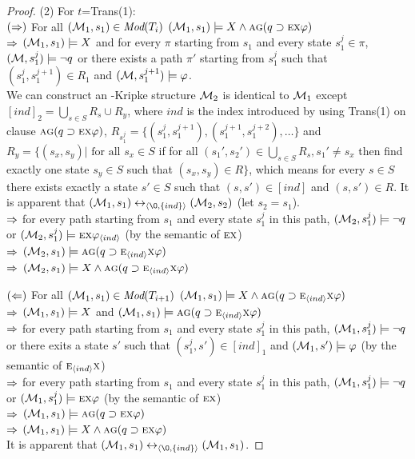 \documentclass[letterpaper]{article} %
\begin{document}
\begin{proof}
(2) For $t$=Trans(1):\\
$(\Rightarrow)$ For all $({\cal M}_1,s_1) \in \textit{Mod}(T_i)$ \ie $({\cal M}_1, s_1) \models X \wedge \textsc{a}\textsc{g}(q \supset \textsc{e} \textsc{x} \varphi)$\\
$\Rightarrow$ $({\cal M}_1,s_1)\models X$ and for every $\pi$ starting from $s_1$ and every state $s_1^j \in \pi$, $({\cal M},s_1^j) \models \neg q$ or there exists a path $\pi'$ starting from $s_1^j$ such that  $(s_1^j,s_1^{j+1})\in R_1$ and $({\cal M},s_1^{j+1})\models \varphi$.\\
We can construct an \Ind-Kripke structure ${\cal M}_2$ is identical to ${\cal M}_1$ except  $[ind]_2= \bigcup_{s\in S} R_s \cup R_y$, where $ind$ is the index introduced by using Trans(1) on clause $\textsc{a}\textsc{g}(q \supset \textsc{e} \textsc{x} \varphi)$, $R_{s_1^{j}}=\{(s_1^{j},s_1^{j+1}), (s_1^{j+1}, s_1^{j+2}),\dots\}$ and $R_y=\{(s_x,s_y)| \text{ for all } s_x \in S$ if for all $(s_1',s_2')\in \bigcup_{s\in S} R_s, s_1'\neq s_x$ then find exactly one state $s_y\in S$ such that $(s_x,s_y)\in R\}$, which means for every $s\in S$ there exists exactly a state $s'\in S$ such that $(s,s')\in [ind]$ and $(s,s')\in R$. It is apparent that $(\Hm_1, s_1) \lrto_{\tuple{{\O}, \{ind\}}} (\Hm_2, s_2)$ (let $s_2=s_1$).\\
$\Rightarrow$ for every path starting from $s_1$ and every state $s_1^j$ in this path, $({\cal M}_2, s_1^j) \models \neg q$ or $({\cal M}_2, s_1^j)\models \textsc{e} \textsc{x} \varphi_{{\langle{ind}\rangle}}$ \hfill (by the semantic of $\textsc{e} \textsc{x}$)\\
$\Rightarrow$ $({\cal M}_2, s_1) \models \textsc{a} \textsc{g}(q \supset \textsc{e}_{{\langle{ind}\rangle}} \textsc{x} \varphi )$\\
$\Rightarrow$ $({\cal M}_2, s_1) \models X \wedge \textsc{a} \textsc{g}(q \supset \textsc{e}_{{\langle{ind}\rangle}} \textsc{x} \varphi )$

$(\Leftarrow)$ For all $({\cal M}_1,s_1) \in \textit{Mod}(T_{i+1})$ \ie $({\cal M}_1,s_1) \models X \wedge \textsc{a} \textsc{g}(q \supset \textsc{e}_{{\langle{ind}\rangle}} \textsc{x} \varphi )$\\
$\Rightarrow$ $({\cal M}_1,s_1) \models X$ and $({\cal M}_1,s_1) \models \textsc{a} \textsc{g}(q \supset \textsc{e}_{{\langle{ind}\rangle}} \textsc{x} \varphi)$\\
$\Rightarrow$ for every path starting from $s_1$ and every state $s_1^j$ in this path, $({\cal M}_1, s_1^j) \models \neg q$ or there exits a state $s'$ such that $(s_1^j, s')\in [ind]_1$ and $({\cal M}_1, s') \models \varphi$ \hfill (by the semantic of $\textsc{e}_{{\langle{ind}\rangle}} \textsc{x}$)\\
$\Rightarrow$ for every path starting from $s_1$ and every state $s_1^j$ in this path, $({\cal M}_1, s_1^j) \models \neg q$ or $({\cal M}_1, s_1^j) \models \textsc{e} \textsc{x} \varphi$ \hfill (by the semantic of $\textsc{e} \textsc{x}$)\\
$\Rightarrow$ $({\cal M}_1,s_1) \models \textsc{a}\textsc{g}(q \supset \textsc{e} \textsc{x} \varphi)$\\
$\Rightarrow$ $({\cal M}_1, s_1) \models X \wedge \textsc{a}\textsc{g}(q \supset \textsc{e} \textsc{x} \varphi)$\\
It is apparent that $(\Hm_1, s_1) \lrto_{\tuple{{\O}, \{ind\}}} (\Hm_1, s_1)$.


\end{proof}
\end{document}

